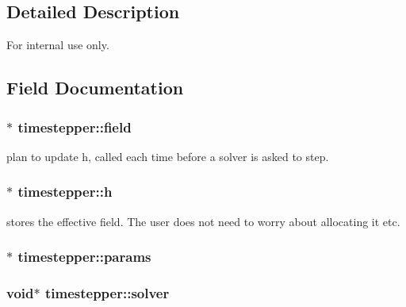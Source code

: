 \subsection{Detailed Description}
\begin{DoxyInternal}{For internal use only.}
\end{DoxyInternal}


\subsection{Field Documentation}
\hypertarget{structtimestepper_aa1e5fa1167a21b8377d1693b3ea5ffd4}{
\subsubsection[{field}]{$\ast$ {\bf timestepper::field}}}
\label{structtimestepper_aa1e5fa1167a21b8377d1693b3ea5ffd4}


plan to update h, called each time before a solver is asked to step. 

\hypertarget{structtimestepper_a2b1cb6aeb25f878d17475c6ef2a47865}{
\subsubsection[{h}]{$\ast$ {\bf timestepper::h}}}
\label{structtimestepper_a2b1cb6aeb25f878d17475c6ef2a47865}


stores the effective field. The user does not need to worry about allocating it etc. 

\hypertarget{structtimestepper_a4722c7e9d91a24dd54fda2618150e3ca}{
\subsubsection[{params}]{$\ast$ {\bf timestepper::params}}}
\label{structtimestepper_a4722c7e9d91a24dd54fda2618150e3ca}
\hypertarget{structtimestepper_a1f105a14fa99654f504e62ea0e565f13}{
\subsubsection[{solver}]{\setlength{\rightskip}{0pt plus 5cm}void$\ast$ {\bf timestepper::solver}}}
\label{structtimestepper_a1f105a14fa99654f504e62ea0e565f13}



